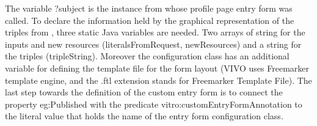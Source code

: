 
The variable ?subject is the instance from whose profile page entry form was called.  To declare the information held by the graphical representation of the triples from , three static Java variables are needed. Two arrays of string for the inputs and new resources (literalsFromRequest, newResources) and a string for the triples (tripleString).  Moreover the configuration class has an additional variable for defining the template file for the form layout (VIVO uses Freemarker template engine, and the .ftl extension stands for Freemarker Template File). 
The last step towards the definition of the custom entry form is to connect the property eg:Published with the predicate vitro:customEntryFormAnnotation to the literal value that holds the name of the entry form configuration class.



